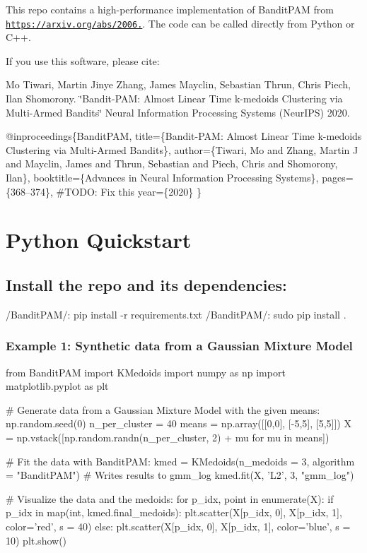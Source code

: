 This repo contains a high-\/performance implementation of Bandit\+P\+AM from \href{https://arxiv.org/abs/2006.06856}{\tt https\+://arxiv.\+org/abs/2006.}. The code can be called directly from Python or C++.

If you use this software, please cite\+:

Mo Tiwari, Martin Jinye Zhang, James Mayclin, Sebastian Thrun, Chris Piech, Ilan Shomorony. \char`\"{}\+Bandit-\/\+P\+A\+M\+: Almost Linear Time k-\/medoids Clustering via Multi-\/\+Armed Bandits\char`\"{} Neural Information Processing Systems (Neur\+I\+PS) 2020.


\begin{DoxyCode}
@inproceedings\{BanditPAM,
  title=\{Bandit-PAM: Almost Linear Time k-medoids Clustering via Multi-Armed Bandits\},
  author=\{Tiwari, Mo and Zhang, Martin J and Mayclin, James and Thrun, Sebastian and Piech, Chris and
       Shomorony, Ilan\},
  booktitle=\{Advances in Neural Information Processing Systems\},
  pages=\{368--374\}, #TODO: Fix this
  year=\{2020\}
\}
\end{DoxyCode}


\section*{Python Quickstart}

\subsection*{Install the repo and its dependencies\+:}


\begin{DoxyCode}
/BanditPAM/: pip install -r requirements.txt
/BanditPAM/: sudo pip install .
\end{DoxyCode}


\subsubsection*{Example 1\+: Synthetic data from a Gaussian Mixture Model}


\begin{DoxyCode}
from BanditPAM import KMedoids
import numpy as np
import matplotlib.pyplot as plt

# Generate data from a Gaussian Mixture Model with the given means:
np.random.seed(0)
n\_per\_cluster = 40
means = np.array([[0,0], [-5,5], [5,5]])
X = np.vstack([np.random.randn(n\_per\_cluster, 2) + mu for mu in means])

# Fit the data with BanditPAM:
kmed = KMedoids(n\_medoids = 3, algorithm = "BanditPAM")
# Writes results to gmm\_log
kmed.fit(X, 'L2', 3, "gmm\_log")

# Visualize the data and the medoids:
for p\_idx, point in enumerate(X):
    if p\_idx in map(int, kmed.final\_medoids):
        plt.scatter(X[p\_idx, 0], X[p\_idx, 1], color='red', s = 40)
    else:
        plt.scatter(X[p\_idx, 0], X[p\_idx, 1], color='blue', s = 10)
plt.show()
\end{DoxyCode}




